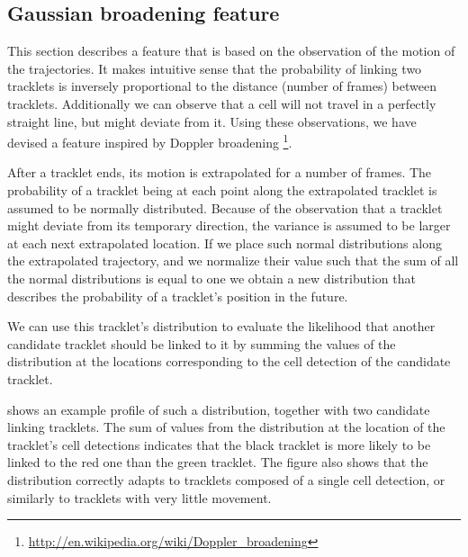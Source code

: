     	\subsection{Gaussian broadening feature \statusfirstdraft}
    		\label{sec:gaussianbroadening}
    		This section describes a feature that is based on the observation of the motion of the trajectories. It makes intuitive sense that the probability of linking two tracklets is inversely proportional to the distance (number of frames) between tracklets. Additionally we can observe that a cell will not travel in a perfectly straight line, but might deviate from it. Using these observations, we have devised a feature inspired by Doppler broadening \footnote{\url{http://en.wikipedia.org/wiki/Doppler_broadening}}.
    		
    		After a tracklet ends, its motion is extrapolated for a number of frames. The probability of a tracklet being at each point along the extrapolated tracklet is assumed to be normally distributed. Because of the observation that a tracklet might deviate from its temporary direction, the variance is assumed to be larger at each next extrapolated location. If we place such normal distributions along the extrapolated trajectory, and we normalize their value such that the sum of all the normal distributions is equal to one we obtain a new distribution that describes the probability of a tracklet's position in the future.
    		
    		We can use this tracklet's distribution to evaluate the likelihood that another candidate tracklet should be linked to it by summing the values of the distribution at the locations corresponding to the cell detection of the candidate tracklet.
    		
    		 shows an example profile of such a distribution, together with two candidate linking tracklets. The sum of values from the distribution at the location of the tracklet's cell detections indicates that the black tracklet is more likely to be linked to the red one than the green tracklet. The figure also shows that the distribution correctly adapts to tracklets composed of a single cell detection, or similarly to tracklets with very little movement.
	

